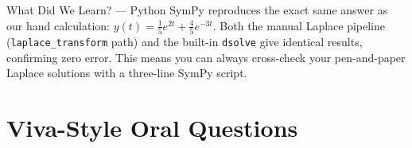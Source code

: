 \documentclass[12pt,a4paper]{article}
\begin{document}
\begin{learnbox}{What Did We Learn? --- Python}
SymPy reproduces the exact same answer as our hand calculation:
\(y(t)=\tfrac{1}{5}e^{2t}+\tfrac{4}{5}e^{-3t}\).
Both the manual Laplace pipeline (\texttt{laplace\_transform} path) and the built-in
\texttt{dsolve} give identical results, confirming zero error.
This means you can always cross-check your pen-and-paper Laplace solutions
with a three-line SymPy script.
\end{learnbox}

\section{Viva-Style Oral Questions}
\end{document}
